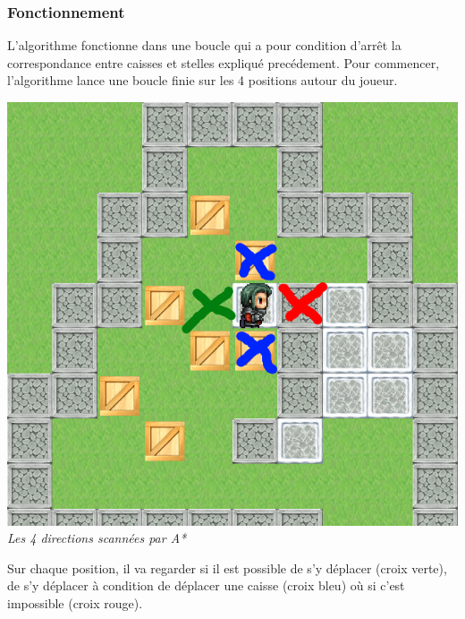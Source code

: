 \documentclass{article}
\begin{document}
\subsubsection{Fonctionnement}
L'algorithme fonctionne dans une boucle qui a pour condition d'arrêt la correspondance entre caisses et stelles expliqué precédement.
\newline
Pour commencer, l'algorithme lance une boucle finie sur les 4 positions autour du joueur.
\begin{center}
\includegraphics[scale=0.3]{img/a00.png} \newline
\textit{Les 4 directions scannées par A*}
\end{center}
Sur chaque position, il va regarder si il est possible de s'y déplacer (croix verte), de s'y déplacer à condition de déplacer une caisse (croix bleu) où si c'est impossible (croix rouge).
\end{document}
